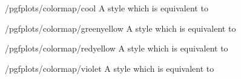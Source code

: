 \begin{stylekey}{/pgfplots/colormap/cool}
	A style which is equivalent to
\begin{codeexample}
\end{codeexample}

\end{stylekey}

\begin{stylekey}{/pgfplots/colormap/greenyellow}
	A style which is equivalent to
\begin{codeexample}
\end{codeexample}

\end{stylekey}

\begin{stylekey}{/pgfplots/colormap/redyellow}
	A style which is equivalent to
\begin{codeexample}
\end{codeexample}

\end{stylekey}

\begin{stylekey}{/pgfplots/colormap/violet}
	A style which is equivalent to
\begin{codeexample}
\end{codeexample}

\end{stylekey}


